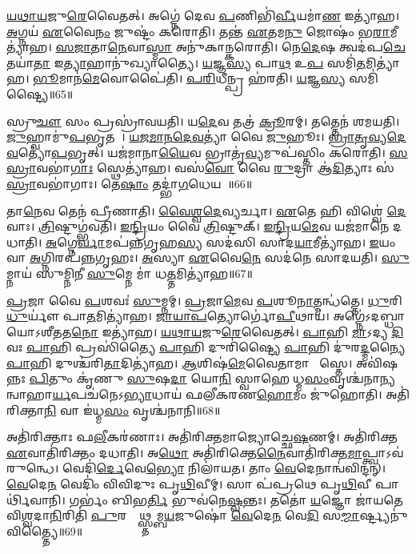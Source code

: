 \ul{𑌯}\ul{𑌥𑌾}\ul{𑌯}𑌜𑍁\ul{𑌰𑍇}𑌵𑍈𑌤𑌤𑍍।
𑌅𑌗𑍍𑌨𑍇॑ 𑌦𑍇𑌵 \ul{𑌪}𑌣𑌿𑌭𑌿॑\ul{𑌰𑍍𑌵𑍀}𑌯𑌮𑌾॑\ul{𑌣} 𑌇𑌤𑍍𑌯𑌾॑𑌹।
\ul{𑌅}𑌗𑍍𑌨𑌯॑ \ul{𑌏}𑌵𑍈\ul{𑌨𑌂} 𑌜𑍁𑌷𑍍𑌟𑌂॑ 𑌕𑌰𑍋𑌤𑌿।
𑌤𑌨𑍍𑌤॑ \ul{𑌏}𑌤𑌮\ul{𑌨𑍁} 𑌜𑍋𑌷𑌂॑ 𑌭\ul{𑌰𑌾}𑌮𑍀𑌤𑍍𑌯𑌾॑𑌹।
\ul{𑌸}\ul{𑌜𑌾}𑌤𑌾\ul{𑌨𑍇}𑌵𑌾\ul{𑌸𑍍𑌮𑌾} 𑌅𑌨𑍁॑𑌕𑌾𑌨𑍍𑌕𑌰𑍋𑌤𑌿।
𑌨𑍇\ul{𑌦𑍇}𑌷 𑌤𑍍𑌵𑌦॑𑌪\ul{𑌚𑍇}𑌤𑌯𑌾॑\ul{𑌤𑌾} 𑌇\ul{𑌤𑍍𑌯𑌾}𑌹𑌾𑌨𑍁॑𑌖𑍍𑌯𑌾𑌤𑍍𑌯𑍈।
\ul{𑌯}𑌜𑍍𑌞\ul{𑌸𑍍𑌯} 𑌪𑌾\ul{𑌥} 𑌉\ul{𑌪} 𑌸𑌮𑌿॑\ul{𑌤}𑌮𑌿𑌤𑍍𑌯𑌾॑𑌹।
\ul{𑌭𑍂}𑌮𑌾𑌨॑\ul{𑌮𑍇}𑌵𑍋𑌪𑍈॑𑌤𑌿।
\ul{𑌪}\ul{𑌰𑌿}𑌧𑍀𑌨𑍍𑌪𑍍𑌰 𑌹॑𑌰𑌤𑌿।
\ul{𑌯}𑌜𑍍𑌞\ul{𑌸𑍍𑌯} 𑌸𑌮𑌿॑𑌷𑍍𑌟𑍍𑌯𑍈॥65॥

𑌸𑍍𑌰𑍁\ul{𑌚𑍗} 𑌸𑌂 𑌪𑍍𑌰𑌸𑍍𑌰𑌾॑𑌵𑌯𑌤𑌿।
𑌯\ul{𑌦𑍇}𑌵 𑌤𑌤𑍍𑌰॑ \ul{𑌕𑍍𑌰𑍂}𑌰𑌮𑍍।
𑌤𑌤𑍍𑌤𑍇𑌨॑ 𑌶𑌮𑌯𑌤𑌿।
\ul{𑌜𑍁}𑌹𑍍𑌵𑌾𑌮𑍁॑\ul{𑌪}𑌭𑍃𑌤𑌮𑍍᳚।
\ul{𑌯}\ul{𑌜}\ul{𑌮𑌾}\ul{𑌨}\ul{𑌦𑍇}\ul{𑌵}𑌤𑍍𑌯𑌾॑ 𑌵𑍈 \ul{𑌜𑍁}𑌹𑍂𑌃।
\ul{𑌭𑍍𑌰𑌾}\ul{𑌤𑍃}\ul{𑌵𑍍𑌯}\ul{𑌦𑍇}\ul{𑌵}𑌤𑍍𑌯𑍋॑\ul{𑌪}𑌭𑍃𑌤𑍍।
𑌯𑌜॑𑌮𑌾𑌨𑌾\ul{𑌯𑍈}𑌵 𑌭𑍍𑌰𑌾𑌤𑍃॑\ul{𑌵𑍍𑌯}𑌮𑍁𑌪॑𑌸𑍍𑌤𑌿𑌂 𑌕𑌰𑍋𑌤𑌿।
\ul{𑌸}\ul{}\ul{𑌸𑍍𑌰𑌾}𑌵𑌭𑌾॑\ul{𑌗𑌾𑌃} 𑌸𑍍𑌥𑍇𑌤𑍍𑌯𑌾॑𑌹।
𑌵𑌸॑\ul{𑌵𑍋} 𑌵𑍈 \ul{𑌰𑍁}𑌦𑍍𑌰𑌾 𑌆॑\ul{𑌦𑌿}𑌤𑍍𑌯𑌾𑌃 𑌸॑\ul{𑌸𑍍𑌰𑌾}𑌵𑌭𑌾॑𑌗𑌾𑌃।
𑌤𑍇\ul{𑌷𑌾𑌂} 𑌤𑌦𑍍𑌭𑌾॑\ul{𑌗}𑌧𑍇𑌯𑌮𑍍᳚॥66॥

𑌤𑌾\ul{𑌨𑍇}𑌵 𑌤𑍇𑌨॑ 𑌪𑍍𑌰𑍀𑌣𑌾𑌤𑌿।
\ul{𑌵𑍈}\ul{𑌶𑍍𑌵}\ul{𑌦𑍇}𑌵𑍍𑌯𑌰𑍍𑌚𑌾।
\ul{𑌏}𑌤𑍇 𑌹𑌿 𑌵𑌿𑌶𑍍𑌵𑍇॑ \ul{𑌦𑍇}𑌵𑌾𑌃।
\ul{𑌤𑍍𑌰𑌿}𑌷𑍍𑌟𑍁𑌗𑍍𑌭॑𑌵𑌤𑌿।
\ul{𑌇}\ul{𑌨𑍍𑌦𑍍𑌰𑌿}𑌯𑌂 𑌵𑍈 \ul{𑌤𑍍𑌰𑌿}𑌷𑍍𑌟𑍁𑌕𑍍।
\ul{𑌇}\ul{𑌨𑍍𑌦𑍍𑌰𑌿}𑌯\ul{𑌮𑍇}𑌵 𑌯𑌜॑𑌮𑌾𑌨𑍇 𑌦𑌧𑌾𑌤𑌿।
\ul{𑌅}𑌗𑍍𑌨𑍇\ul{𑌰𑍍𑌵𑌾}𑌮𑌪॑𑌨𑍍𑌨𑌗𑍃𑌹\ul{𑌸𑍍𑌯} 𑌸𑌦॑𑌸𑌿 𑌸𑌾𑌦\ul{𑌯𑌾}𑌮𑍀𑌤𑍍𑌯𑌾॑𑌹।
\ul{𑌇}𑌯𑌂 𑌵𑌾 \ul{𑌅}𑌗𑍍𑌨𑌿𑌰𑌪॑𑌨𑍍𑌨𑌗𑍃𑌹𑌃।
\ul{𑌅}𑌸𑍍𑌯𑌾 \ul{𑌏}𑌵𑍈\ul{𑌨𑍇} 𑌸𑌦॑𑌨𑍇 𑌸𑌾𑌦𑌯𑌤𑌿।
\ul{𑌸𑍁}𑌮𑍍𑌨𑌾𑌯॑ 𑌸𑍁𑌮𑍍𑌨𑌿𑌨𑍀 \ul{𑌸𑍁}𑌮𑍍𑌨𑍇 𑌮𑌾॑ 𑌧\ul{𑌤𑍍𑌤}𑌮𑌿𑌤𑍍𑌯𑌾॑𑌹॥67॥

\ul{𑌪𑍍𑌰}𑌜𑌾 𑌵𑍈 \ul{𑌪}𑌶𑌵𑌃॑ \ul{𑌸𑍁}𑌮𑍍𑌨𑌮𑍍।
\ul{𑌪𑍍𑌰}𑌜𑌾\ul{𑌮𑍇}𑌵 \ul{𑌪}𑌶𑍂\ul{𑌨𑌾}𑌤𑍍𑌮𑌨𑍍𑌧॑𑌤𑍍𑌤𑍇।
\ul{𑌧𑍁}𑌰𑌿 \ul{𑌧𑍁}𑌰𑍍𑌯𑍗॑ 𑌪𑌾\ul{𑌤}𑌮𑌿𑌤𑍍𑌯𑌾॑𑌹।
\ul{𑌜𑌾}\ul{𑌯𑌾}\ul{𑌪}𑌤𑍍𑌯𑍋𑌰𑍍𑌗𑍋॑\ul{𑌪𑍀}𑌥𑌾𑌯॑।
𑌅𑌗𑍍𑌨𑍇॑\-𑌽𑌦𑌬𑍍𑌧𑌾𑌯𑍋\-𑌽𑌶𑍀𑌤𑌤\ul{𑌨𑍋} 𑌇𑌤𑍍𑌯𑌾॑𑌹।
\ul{𑌯}\ul{𑌥𑌾}\ul{𑌯}𑌜𑍁\ul{𑌰𑍇}𑌵𑍈𑌤𑌤𑍍।
\ul{𑌪𑌾}𑌹𑌿 \ul{𑌮𑌾}𑌽𑌦𑍍𑌯 \ul{𑌦𑌿}𑌵𑌃 \ul{𑌪𑌾}𑌹𑌿 𑌪𑍍𑌰𑌸𑌿॑𑌤𑍍𑌯𑍈 \ul{𑌪𑌾}𑌹𑌿 𑌦𑍁𑌰𑌿॑𑌷𑍍𑌟𑍍𑌯𑍈 \ul{𑌪𑌾}𑌹𑌿 𑌦𑍁॑𑌰\ul{𑌦𑍍𑌮}𑌨𑍍𑌯𑍈 \ul{𑌪𑌾}𑌹𑌿 𑌦𑍁𑌶𑍍𑌚॑𑌰𑌿\ul{𑌤𑌾}𑌦𑌿𑌤𑍍𑌯𑌾॑𑌹।
\ul{𑌆}𑌶𑌿𑌷॑\ul{𑌮𑍇}𑌵𑍈𑌤𑌾𑌮𑌾 𑌶𑌾᳚𑌸𑍍𑌤𑍇।
𑌅𑌵𑌿॑𑌷𑌨𑍍𑌨𑌃 \ul{𑌪𑌿}𑌤𑍁𑌂 𑌕𑍃॑𑌣𑍁 \ul{𑌸𑍁}𑌷\ul{𑌦𑌾} 𑌯𑍋\ul{𑌨𑌿}\ul{} 𑌸𑍍𑌵𑌾𑌹𑍇𑌤𑍀᳚𑌧𑍍𑌮\ul{𑌸𑌂}𑌵𑍃𑌶𑍍𑌚॑𑌨𑌾𑌨𑍍𑌯𑌨𑍍𑌵𑌾𑌹𑌾\ul{𑌰𑍍𑌯}𑌪𑌚॑𑌨𑍇\-𑌽\ul{𑌭𑍍𑌯𑌾}𑌧𑌾𑌯॑ 𑌫𑌲𑍀𑌕𑌰𑌣\ul{𑌹𑍋}𑌮𑌂 𑌜𑍁॑𑌹𑍋𑌤𑌿।
𑌅𑌤𑌿॑𑌰𑌿𑌕𑍍𑌤𑌾\ul{𑌨𑌿} 𑌵𑌾 𑌇॑𑌧𑍍𑌮\ul{𑌸𑌂} 𑌵𑍃𑌶𑍍𑌚॑𑌨𑌾𑌨𑌿॥68॥

𑌅𑌤𑌿॑𑌰𑌿𑌕𑍍𑌤𑌾𑌃 𑌫\ul{𑌲𑍀}𑌕𑌰॑𑌣𑌾𑌃।
𑌅𑌤𑌿॑𑌰𑌿𑌕𑍍𑌤𑌮𑌾𑌜𑍍𑌯𑍋𑌚𑍍𑌛𑍇\ul{𑌷}𑌣𑌮𑍍।
𑌅𑌤𑌿॑𑌰𑌿𑌕𑍍𑌤 \ul{𑌏}𑌵𑌾𑌤𑌿॑𑌰𑌿𑌕𑍍𑌤𑌂 𑌦𑌧𑌾𑌤𑌿।
𑌅\ul{𑌥𑍋} 𑌅𑌤𑌿॑𑌰𑌿𑌕𑍍𑌤𑍇\ul{𑌨𑍈}𑌵𑌾𑌤𑌿॑\-𑌰𑌿𑌕𑍍𑌤\-\ul{𑌮𑌾}𑌪𑍍𑌤𑍍𑌵𑌾𑌽𑌵॑ 𑌰𑍁𑌨𑍍𑌧𑍇।
𑌵𑍇𑌦𑌿॑\ul{𑌰𑍍𑌦𑍇}𑌵𑍇\ul{𑌭𑍍𑌯𑍋} 𑌨𑌿𑌲𑌾॑𑌯𑌤।
𑌤𑌾𑌂 \ul{𑌵𑍇}𑌦𑍇𑌨𑌾𑌨𑍍𑌵॑𑌵𑌿𑌨𑍍𑌦𑌨𑍍।
\ul{𑌵𑍇}𑌦𑍇\ul{𑌨} 𑌵𑍇𑌦𑌿𑌂॑ 𑌵𑌿𑌵𑌿𑌦𑍁𑌃 𑌪𑍃\ul{𑌥𑌿}𑌵𑍀𑌮𑍍।
𑌸𑌾 𑌪॑𑌪𑍍𑌰𑌥𑍇 𑌪𑍃\ul{𑌥𑌿}𑌵𑍀 𑌪𑌾𑌰𑍍𑌥𑌿॑𑌵𑌾𑌨𑌿।
𑌗𑌰𑍍𑌭𑌂॑ 𑌬𑌿𑌭\ul{𑌰𑍍𑌤𑌿} 𑌭𑍁𑌵॑𑌨𑍇\ul{𑌷𑍍𑌵}𑌨𑍍𑌤𑌃।
𑌤𑌤𑍋॑ \ul{𑌯}𑌜𑍍𑌞𑍋 𑌜𑌾॑𑌯𑌤𑍇 𑌵𑌿\ul{𑌶𑍍𑌵}𑌦𑌾\ul{𑌨𑌿}𑌰𑌿𑌤𑌿॑ \ul{𑌪𑍁}𑌰𑌸𑍍𑌤𑌾᳚𑌥𑍍𑌸𑍍𑌤𑌮𑍍𑌬\ul{𑌯}𑌜𑍁𑌷𑍋॑ \ul{𑌵𑍇}𑌦𑍇\ul{𑌨} 𑌵𑍇\ul{𑌦𑌿}\ul{} 𑌸\ul{𑌮𑍍𑌮𑌾}𑌰𑍍𑌷𑍍𑌟𑍍𑌯𑌨𑍁॑𑌵𑌿𑌤𑍍𑌤𑍍𑌯𑍈॥69॥

